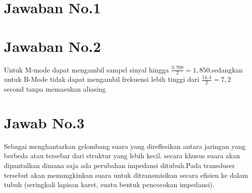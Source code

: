 \section{Jawaban No.1}


\section{Jawaban No.2}
Untuk M-mode dapat mengambil sampel sinyal hingga $\frac{3,700}{2} = 1,850. $sedangkan untuk B-Mode tidak dapat mengambil frekuensi lebih tinggi dari $\frac{14,4}{2}=7,2$ second tanpa memasukan aliasing

\section{Jawab No.3}
Sebagai menghantarkan gelombang suara yang direflesikan antara jaringan yang berbeda atau tersebar dari struktur yang lebih kecil. secara khusus suara akan dipantulkan dimana saja ada perubahan impedansi ditubuh.Pada transduser tersebut akan memungkinkan suara untuk ditransmisikan secara efisien ke dalam tubuh (seringkali lapisan karet, suatu bentuk pencocokan impedansi).
